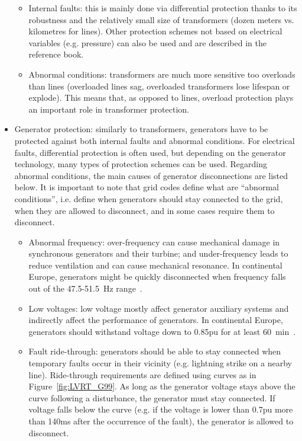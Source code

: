 \begin{itemize}
\begin{itemize}
        \item Internal faults: this is mainly done via differential protection thanks to its robustness and the relatively small size of transformers (dozen meters vs. kilometres for lines). Other protection schemes not based on electrical variables (e.g. pressure) can also be used and are described in the reference book.
        \item Abnormal conditions: transformers are much more sensitive too overloads than lines (overloaded lines sag, overloaded transformers lose lifespan or explode). This means that, as opposed to lines, overload protection plays an important role in transformer protection.
    \end{itemize}
    \item Generator protection: similarly to transformers, generators have to be protected against both internal faults and abnormal conditions. For electrical faults, differential protection is often used, but depending on the generator technology, many types of protection schemes can be used. Regarding abnormal conditions, the main causes of generator disconnections are listed below. It is important to note that grid codes define what are ``abnormal conditions'', i.e. define when generators should stay connected to the grid, when they are allowed to disconnect, and in some cases require them to disconnect.
    \begin{itemize}
        \item Abnormal frequency: over-frequency can cause mechanical damage in synchronous generators and their turbine; and under-frequency leads to reduce ventilation and can cause mechanical resonance. In continental Europe, generators might be quickly disconnected when frequency falls out of the 47.5-51.5~Hz range~\cite{ENTSOEgeneratorRequirements}.
        \item Low voltages: low voltage mostly affect generator auxiliary systems and indirectly affect the performance of generators. In continental Europe, generators should withstand voltage down to 0.85pu for at least 60~min~\cite{ENTSOEgeneratorRequirements}.
        \item Fault ride-through: generators should be able to stay connected when temporary faults occur in their vicinity (e.g. lightning strike on a nearby line). Ride-through requirements are defined using curves as in Figure~\ref{fig:LVRT_G99}. As long as the generator voltage stays above the curve following a disturbance, the generator must stay connected. If voltage falls below the curve (e.g. if the voltage is lower than 0.7pu more than 140ms after the occurrence of the fault), the generator is allowed to disconnect.

\end{itemize}
\end{itemize}
